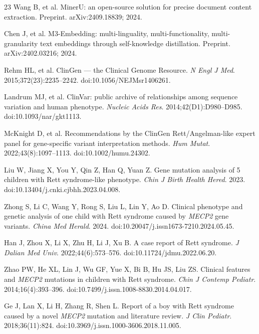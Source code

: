 \documentclass[preprint,12pt]{elsarticle}
\begin{document}
\begin{thebibliography}{23}
Wang B, et al.
\newblock MinerU: an open-source solution for precise document content
  extraction.
\newblock Preprint. arXiv:2409.18839; 2024.

Chen J, et al.
\newblock M3-Embedding: multi-linguality, multi-functionality,
  multi-granularity text embeddings through self-knowledge distillation.
\newblock Preprint. arXiv:2402.03216; 2024.

Rehm HL, et al.
\newblock ClinGen --- the Clinical Genome Resource.
\newblock \emph{N Engl J Med}. 2015;372(23):2235--2242.
\newblock doi:10.1056/NEJMsr1406261.

Landrum MJ, et al.
\newblock ClinVar: public archive of relationships among sequence
  variation and human phenotype.
\newblock \emph{Nucleic Acids Res}. 2014;42(D1):D980--D985.
\newblock doi:10.1093/nar/gkt1113.

McKnight D, et al.
\newblock Recommendations by the ClinGen Rett/Angelman-like expert panel
  for gene-specific variant interpretation methods.
\newblock \emph{Hum Mutat}. 2022;43(8):1097--1113.
\newblock doi:10.1002/humu.24302.

Liu W, Jiang X, You Y, Qin Z, Han Q, Yuan Z.
\newblock Gene mutation analysis of 5 children with Rett syndrome-like
  phenotype.
\newblock \emph{Chin J Birth Health Hered}. 2023.
\newblock doi:10.13404/j.cnki.cjbhh.2023.04.008.

Zhong S, Li C, Wang Y, Rong S, Liu L, Lin Y, Ao D.
\newblock Clinical phenotype and genetic analysis of one child with Rett
  syndrome caused by \textit{MECP2} gene variants.
\newblock \emph{China Med Herald}. 2024.
\newblock doi:10.20047/j.issn1673-7210.2024.05.45.

Han J, Zhou X, Li X, Zhu H, Li J, Xu B.
\newblock A case report of Rett syndrome.
\newblock \emph{J Dalian Med Univ}. 2022;44(6):573--576.
\newblock doi:10.11724/jdmu.2022.06.20.

Zhao PW, He XL, Lin J, Wu GF, Yue X, Bi B, Hu JS, Liu ZS.
\newblock Clinical features and \textit{MECP2} mutations in children with
  Rett syndrome.
\newblock \emph{Chin J Contemp Pediatr}. 2014;16(4):393--396.
\newblock doi:10.7499/j.issn.1008-8830.2014.04.017.

Ge J, Lan X, Li H, Zhang R, Shen L.
\newblock Report of a boy with Rett syndrome caused by a novel
  \textit{MECP2} mutation and literature review.
\newblock \emph{J Clin Pediatr}. 2018;36(11):824.
\newblock doi:10.3969/j.issn.1000-3606.2018.11.005.


\end{thebibliography}
\end{document}
